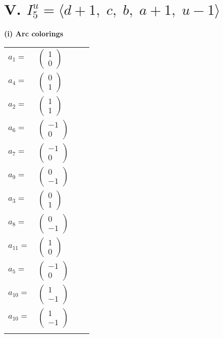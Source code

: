\documentclass[1p]{elsarticle_modified}
\theoremstyle{definition}
\begin{document}
\centering \section*{V. $I^u_{5}= \langle d+1,\;c,\;b,\;a+1,\;u-1 \rangle$}
\flushleft \textbf{(i) Arc colorings}\\
\begin{tabular}{m{7pt} m{180pt} m{7pt} m{180pt} }
\flushright $a_{1}=$&$\begin{pmatrix}1\\0\end{pmatrix}$ \\
\flushright $a_{4}=$&$\begin{pmatrix}0\\1\end{pmatrix}$ \\
\flushright $a_{2}=$&$\begin{pmatrix}1\\1\end{pmatrix}$ \\
\flushright $a_{6}=$&$\begin{pmatrix}-1\\0\end{pmatrix}$ \\
\flushright $a_{7}=$&$\begin{pmatrix}-1\\0\end{pmatrix}$ \\
\flushright $a_{9}=$&$\begin{pmatrix}0\\-1\end{pmatrix}$ \\
\flushright $a_{3}=$&$\begin{pmatrix}0\\1\end{pmatrix}$ \\
\flushright $a_{8}=$&$\begin{pmatrix}0\\-1\end{pmatrix}$ \\
\flushright $a_{11}=$&$\begin{pmatrix}1\\0\end{pmatrix}$ \\
\flushright $a_{5}=$&$\begin{pmatrix}-1\\0\end{pmatrix}$ \\
\flushright $a_{10}=$&$\begin{pmatrix}1\\-1\end{pmatrix}$\\ \flushright $a_{10}=$&$\begin{pmatrix}1\\-1\end{pmatrix}$\\&\end{tabular}
\end{document}
